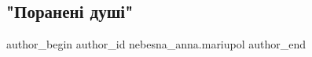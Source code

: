  
 
 
 
 

\subsection{"Поранені душі"}
\label{sec:19_04_2022.fb.nebesna_anna.mariupol.1.poraneni_dushi}

\ifcmt
 author_begin
   author_id nebesna_anna.mariupol
 author_end
\fi
